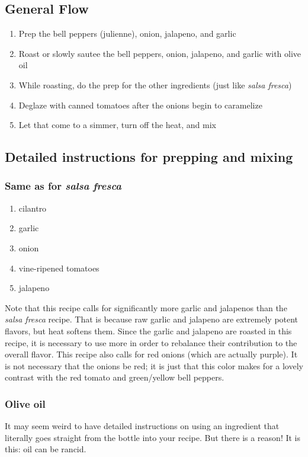 \subsection{General Flow} \begin{enumerate}
    \item Prep the bell peppers (julienne), onion, jalapeno, and garlic
    \item Roast or slowly sautee the bell peppers, onion, jalapeno, and garlic with olive oil
    \item While roasting, do the prep for the other ingredients (just like \textit{salsa fresca})
    \item Deglaze with canned tomatoes after the onions begin to caramelize
    \item Let that come to a simmer, turn off the heat, and mix
\end{enumerate}

\subsection{Detailed instructions for prepping and mixing}

\subsubsection{Same as for \textit{salsa fresca}} \begin{enumerate}
    \item cilantro
    \item garlic
    \item onion
    \item vine-ripened tomatoes
    \item jalapeno
\end{enumerate}

Note that this recipe calls for significantly more garlic and jalapenos than the \textit{salsa fresca} recipe. That is because raw garlic and jalapeno are extremely potent flavors, but heat softens them. Since the garlic and jalapeno are roasted in this recipe, it is necessary to use more in order to rebalance their contribution to the overall flavor. This recipe also calls for red onions (which are actually purple). It is not necessary that the onions be red; it is just that this color makes for a lovely contrast with the red tomato and green/yellow bell peppers. 

\subsubsection{Olive oil}
It may seem weird to have detailed instructions on using an ingredient that literally goes straight from the bottle into your recipe. But there is a reason! It is this: oil can be rancid. 

